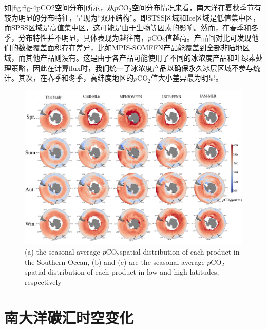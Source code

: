 如\autoref{fig:fig-4pCO2空间分布}所示，从$p\mathrm{CO_2}$空间分布情况来看，南大洋在夏秋季节有较为明显的分布特征，呈现为“双环结构”。即STSS区域和Ice区域是低值集中区，而SPSS区域是高值集中区，这可能是由于生物等因素的影响。然而，在春季和冬季，分布特性并不明显，具体表现为越往南，$p\mathrm{CO_2}$值越高。产品间对比可发现他们的数据覆盖面积存在差异，比如MPIS-SOMFFN产品能覆盖到全部非陆地区域，而其他产品则没有。这是由于各产品可能使用了不同的冰浓度产品和叶绿素处理策略，因此在计算flux时，我们统一了冰浓度产品以确保永久冰层区域不参与统计。其次，在春季和冬季，高纬度地区的$p\mathrm{CO_2}$值大小差异最为明显。

\begin{figure}[htbp]
    \centering
    \includegraphics[width=\linewidth]{figure/第四章用图/图4-pCO2分布.jpg}
    {(a) the seasonal average $p\mathrm{CO_2}$spatial distribution of each product in the Southern Ocean, (b) and (c) are the seasonal average $p\mathrm{CO_2}$spatial distribution of each product in low and high latitudes, respectively}
\end{figure}

\section{南大洋碳汇时空变化}
